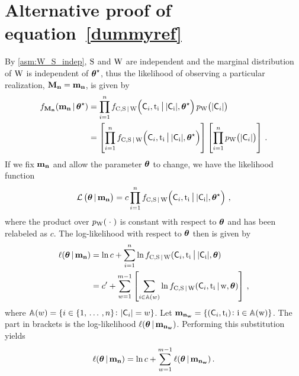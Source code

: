 \documentclass[
    11pt,
    extrafontsizes,
    article,
    oldfontcommands,
    final,
    oneside,
    openany,
    hidelinks]{memoir}
\begin{document}
\chapter{Alternative proof of equation~\ref{dummyref}}
By \cref{asm:W_S_indep}, $\mathrm{S}$ and $\mathrm{W}$ are independent and the marginal distribution of $\mathrm{W}$ is independent of ${\boldsymbol{\mathbf{\theta}}}^{\star}$, thus the likelihood of observing a particular realization, $\boldsymbol{\mathbf{M_n}} = \boldsymbol{\mathbf{m_n}}$, is given by
\begin{equation}
\begin{split}
    \pdf_{\mfs}(\mfso \given \tparam{\sysparamvec})
        &= \prod_{i=1}^{n} \jointpdf\!\left(\cand_i, \ti_i \mathlarger{\given} \Card{\cand_i}, \tparam\sysparamvec\right) \pmf_{\RV{W}}\!\left(\Card{\cand_i}\right)\\
        &= \left[\prod_{i=1}^{n} \jointpdf\!\left(\cand_i, \ti_i \mathlarger{\given} \Card{\cand_i}, \tparam\sysparamvec\right)\right]\left[\prod_{i=1}^{n} \pmf_{\RV{W}}\!\left(\Card{\cand_i}\right)\right]\,.
\end{split}
\end{equation}
If we fix $\boldsymbol{\mathbf{m_n}}$ and allow the parameter $\boldsymbol{\mathbf{\theta}}$ to change, we have the likelihood function
\begin{equation}
    \likelihood\left(\sysparamvec \given \mfso\right) = c \prod_{i=1}^{n} \jointpdf\!\left(\cand_i, \ti_i \mathlarger{\given} \Card{\cand_i}, \tparam\sysparamvec\right)\,,
\end{equation}
where the product over $p_{\mathrm{W}}(\;\cdot\;)$ is constant with respect to $\boldsymbol{\mathbf{\theta}}$ and has been relabeled as $c$. The log-likelihood with respect to $\boldsymbol{\mathbf{\theta}}$ then is given by
\begin{equation}
\begin{split}
    \ell(\sysparamvec \given \mfso)
        &= \ln c + \sum_{i=1}^{n} \ln \jointpdf(\cand_i,\ti_i \mathlarger{\given} \Card{\cand_i}, \sysparamvec)\\
        &= c' + \sum_{w=1}^{m-1} \left[\sum_{i \in \mathbb{A}(w)}\ln \jointpdf(\cand_i,\ti_i \given w, \sysparamvec)\right]\,,
\end{split}
\end{equation}
where $\mathbb{A}(w) = \{i \in \{1,\,\ldots\,,n\} \colon \Card{\cand_i} = w\}$. Let $\mfsoi{n_w} = \{(\cand_i, \ti_i) \colon i \in \mathbb{A}(w)\}$. The part in brackets is the log-likelihood $\ell(\boldsymbol{\mathbf{\theta}} {\,|\,} \boldsymbol{\mathbf{m_{n_w}}})$. Performing this substitution yields
\begin{equation}
    \ell(\boldsymbol{\mathbf{\theta}} {\,|\,} \boldsymbol{\mathbf{m_n}}) = \ln c + \sum_{w=1}^{m-1} \ell(\boldsymbol{\mathbf{\theta}} {\,|\,} \boldsymbol{\mathbf{m_{n_w}}})\,.
\end{equation}
\end{document}
